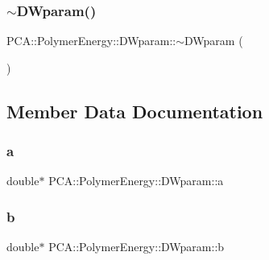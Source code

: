 \hypertarget{class_p_c_a_1_1_polymer_energy_1_1_d_wparam_a97b71972cd114d0a5a0aed004ec3a9f8}{}\label{class_p_c_a_1_1_polymer_energy_1_1_d_wparam_a97b71972cd114d0a5a0aed004ec3a9f8} 
\subsubsection{\texorpdfstring{$\sim$\+D\+Wparam()}{~DWparam()}}
{\footnotesize\ttfamily P\+C\+A\+::\+Polymer\+Energy\+::\+D\+Wparam\+::$\sim$\+D\+Wparam (\begin{DoxyParamCaption}{ }\end{DoxyParamCaption})}



\subsection{Member Data Documentation}
\hypertarget{class_p_c_a_1_1_polymer_energy_1_1_d_wparam_a04564ebaeb5a082c0aea0b184aa84faf}{}\label{class_p_c_a_1_1_polymer_energy_1_1_d_wparam_a04564ebaeb5a082c0aea0b184aa84faf} 
\subsubsection{\texorpdfstring{a}{a}}
{\footnotesize\ttfamily double$\ast$ P\+C\+A\+::\+Polymer\+Energy\+::\+D\+Wparam\+::a}

\hypertarget{class_p_c_a_1_1_polymer_energy_1_1_d_wparam_a956852f19d2c08dd73b5a5b392d79bae}{}\label{class_p_c_a_1_1_polymer_energy_1_1_d_wparam_a956852f19d2c08dd73b5a5b392d79bae} 
\subsubsection{\texorpdfstring{b}{b}}
{\footnotesize\ttfamily double$\ast$ P\+C\+A\+::\+Polymer\+Energy\+::\+D\+Wparam\+::b}


